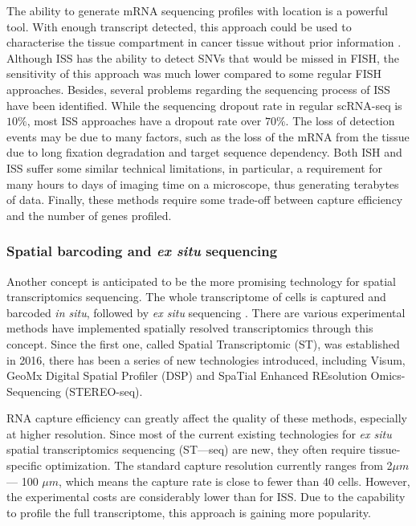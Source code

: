 The ability to generate mRNA sequencing profiles with location is a powerful tool. With enough transcript detected, this approach could be used to characterise the tissue compartment in cancer tissue without prior information  \cite{ke2013situ}. Although ISS has the ability to detect SNVs that would be missed in FISH, the sensitivity of this approach was much lower compared to some regular FISH approaches. Besides, several problems regarding the sequencing process of ISS have been identified. While the sequencing dropout rate in regular scRNA-seq is $10\%$, most ISS approaches have a dropout rate over $70\%$. The loss of detection events may be due to many factors, such as the loss of the
mRNA from the tissue due to long fixation degradation and target sequence dependency. Both ISH and ISS suffer some similar technical limitations, in particular, a requirement for many hours to days of imaging time on a microscope, thus generating terabytes of data. Finally, these methods require some trade-off between capture efficiency and the number of genes profiled. 

\subsubsection{Spatial barcoding and \textit{ex situ} sequencing}
Another concept is anticipated to be the more promising technology for spatial transcriptomics sequencing. The whole transcriptome of cells is captured and barcoded \textit{in situ}, followed by \textit{ex situ} sequencing \cite{asp2020spatially}. There are various experimental methods have implemented spatially resolved transcriptomics through this concept. Since the first one, called Spatial Transcriptomic (ST), was established in 2016, there has been a series of new technologies introduced, including Visum, GeoMx Digital Spatial Profiler (DSP) and SpaTial Enhanced REsolution Omics-Sequencing (STEREO-seq). 

RNA capture efficiency can greatly affect the quality of these methods, especially at higher resolution. Since most of the current existing technologies for \textit{ex situ} spatial transcriptomics sequencing (ST—seq) are new, they often require tissue-specific optimization. The standard capture resolution currently ranges from 2$\mu m$ — 100 $\mu m$, which means the capture rate is close to fewer than 40 cells. However, the experimental costs are considerably lower than for ISS. Due to the capability to profile the full transcriptome, this approach is gaining more popularity.          


